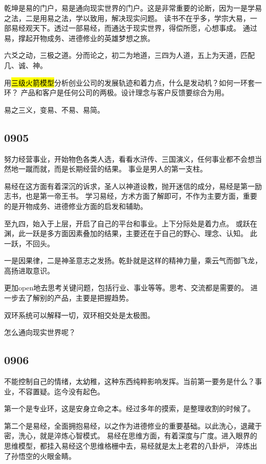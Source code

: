 乾坤是易的门户，易是通向现实世界的门户。这是非常重要的论断，因为一是学易之法，二是用易之法，学以致用，解决现实问题。
读书不在乎多，学宗大易，一部易经观天下。透过一部易经，而通达于现实世界，得偿所愿，心想事成。
通过易，撑起开物成务、进德修业的英雄梦想之旅。

六爻之动，三极之道。分而论之，初二为地道，三四为人道，五上为天道，匹配几、诚、神。

用\hl{三级火箭模型}分析创业公司的发展轨迹和着力点，什么是发动机？如何一环套一环？
产品和客户是任何公司的两极。设计理念与客户反馈要综合为用。

易之三义，变易、不易、易简。

\subsection{0905}

努力经营事业，开始物色各类人选，看看水浒传、三国演义，任何事业都不会想当然地一蹴而就，而是长期经营的结果。
事业是男人的第一支柱。

易经在这方面有着深沉的诉求，圣人以神道设教，抛开迷信的成分，易经是第一励志书，也是第一帝王书。
学习易经，方术方面了解即可，不作为主要方面，重要的是开物成务、进德修业方面的启发和辅助。

至九四，始入于上层，开启了自己的平台和事业。上下分际处是着力点。
或跃在渊，此一跃是多方面因素叠加的结果，主要还在于自己的野心、理念、认知。
此一跃，不回头。

一是因果律，二是神圣意志之发扬。乾卦就是这样的精神力量，乘云气而御飞龙，高扬进取意识。

更加open地去思考关键问题，包括行业、事业等等。思考、交流都是需要的。
进一步去了解别的产品，主要是把握趋势。

双环系统可以解释一切，双环相交处是太极图。

怎么通向现实世界呢？

\subsection{0906}

不能控制自己的情绪，太幼稚，这种东西纯粹影响发挥。当前第一要务是什么？事业，不容置疑。迄今没有起色。

第一个是专业环，这是安身立命之本。经过多年的摸索，是整理收割的时候了。

第二个是易经，全面拥抱易经，以之作为进德修业的重要基础。以此洗心，退藏于密，洗心，就是淬炼心智模式。
易经在思维方面，有着深度与广度。进入眼界的思维模型，都挂入易经这个思维格栅中去，易经就是太上老君的八卦炉，
淬炼出了孙悟空的火眼金睛。

